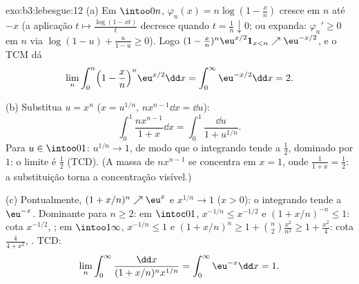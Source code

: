\begin{solution}{exo:b3:lebesgue:12}
(a) Em $\intoo0n$, $\varphi_n(x) = n\log(1 - \frac xn)$
cresce em $n$ até $-x$ (a aplicação $t \mapsto
\frac{\log(1 - xt)}{t}$ decresce quando $t = \frac1n
\downarrow 0$; ou expanda: $\varphi_{n}' \geq 0$ em $n$ via
$\log(1-u) + \frac{u}{1-u} \geq 0$). Logo $(1 -
\frac xn)^n\eu^{x/2}\mathbf 1_{x<n} \nearrow
\eu^{-x/2}$, e o TCM dá
\[
\lim_n\int_0^n\Bigl(1 - \frac xn\Bigr)^n\eu^{x/2}\dd x =
\int_0^\infty\eu^{-x/2}\dd x = 2 .
\]

(b) Substitua $u = x^n$ ($x = u^{1/n}$, $n x^{n-1}\dd x =
\dd u$):
\[
\int_0^1\frac{nx^{n-1}}{1 + x}\dd x =
\int_0^1\frac{\dd u}{1 + u^{1/n}} .
\]
Para $u \in \intoo01$: $u^{1/n} \to 1$, de modo que o integrando
tende a $\frac12$, dominado por $1$: o limite é
$\frac12$ (TCD). (A massa de $nx^{n-1}$ se concentra em $x
= 1$, onde $\frac1{1+x} = \frac12$: a substituição torna
a concentração visível.)

(c) Pontualmente, $(1 + x/n)^n \nearrow \eu^x$ e $x^{1/n} \to
1$ ($x > 0$): o integrando tende a $\eu^{-x}$. Dominante
para $n \geq 2$: em $\intoc01$, $x^{-1/n} \leq x^{-1/2}$ e
$(1 + x/n)^{-n} \leq 1$: cota $x^{-1/2}$, ; em
$\intoo1\infty$, $x^{-1/n} \leq 1$ e $(1 + x/n)^n \geq 1 +
\binom n2\frac{x^2}{n^2} \geq 1 + \frac{x^2}4$: cota
$\frac{4}{4 + x^2}$, . TCD:
\[
\lim_n\int_0^\infty\frac{\dd x}{(1 + x/n)^nx^{1/n}} =
\int_0^\infty\eu^{-x}\dd x = 1 .
\]
\end{solution}


